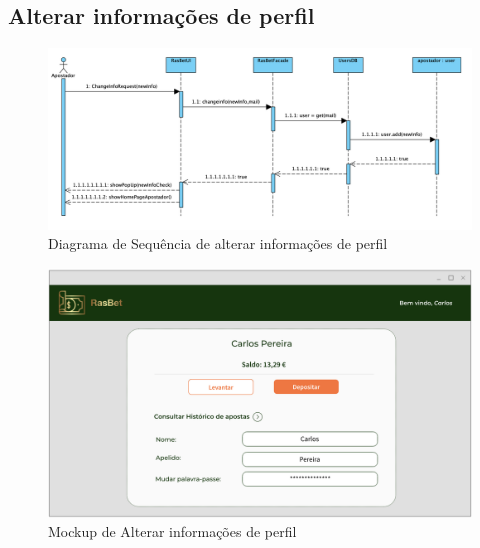 \subsection{Alterar informações de perfil}
\begin{figure}[H]
\centering
\includegraphics[width=1\textwidth]{imagens/ambitoProduto/SalterarInfo.png}
\caption{Diagrama de Sequência de alterar informações de perfil}
\end{figure}
\begin{figure}[H]
\centering
\includegraphics[width=1\textwidth]{imagens/ambitoProduto/Mockups/M_Configuracoes.png}
\caption{Mockup de Alterar informações de perfil}
\end{figure}

